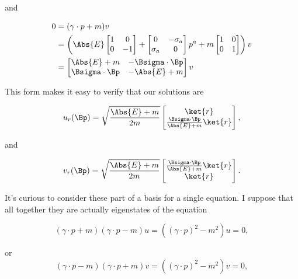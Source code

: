and

\begin{align*}
0 &= (\gamma \cdot p + m ) v \\
&= 
\left(
\Abs{E} 
\begin{bmatrix}
1 & 0 \\
0 & -1 
\end{bmatrix}
+ 
\begin{bmatrix}
0 & - \sigma_a \\
\sigma_a & 0
\end{bmatrix}
p^a
+ m
\begin{bmatrix}
1 & 0 \\
0 & 1 
\end{bmatrix}
\right) v \\
&=
\begin{bmatrix}
\Abs{E} + m & - \Bsigma \cdot \Bp \\
\Bsigma \cdot \Bp & -\Abs{E} + m
\end{bmatrix} v
\end{align*}

This form makes it easy to verify that our solutions are

\begin{equation}\label{eqn:desaiDiracAdjoint:30a}
u_r(\Bp) =
\sqrt{\frac{\Abs{E} + m}{2m}}
\begin{bmatrix}
\ket{r} \\
\frac{\Bsigma \cdot \Bp}{\Abs{E} + m} \ket{r}
\end{bmatrix},
\end{equation}

and

\begin{equation}\label{eqn:desaiDiracAdjoint:50a}
v_r(\Bp) =
\sqrt{\frac{\Abs{E} + m}{2m}}
\begin{bmatrix}
\frac{\Bsigma \cdot \Bp}{\Abs{E} + m} \ket{r} \\
\ket{r} \\
\end{bmatrix}.
\end{equation}

It's curious to consider these part of a basis for a single equation.  I suppose that all together they are actually eigenstates of the equation

\begin{equation}\label{eqn:desaiDiracAdjoint:500}
(\gamma \cdot p + m) (\gamma \cdot p - m) u = ((\gamma \cdot p)^2 - m^2) u = 0,
\end{equation}

or
\begin{equation}\label{eqn:desaiDiracAdjoint:520}
(\gamma \cdot p - m) (\gamma \cdot p + m) v = ((\gamma \cdot p)^2 - m^2) v = 0,
\end{equation}

